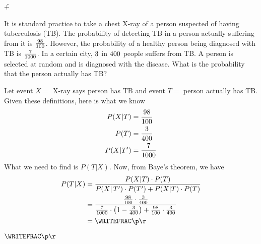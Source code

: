 


\EXPR[0]
\EXPR[0]\q{(\vb * (\vd - \vc))}
\EXPR[0]\r{\p + \q}

\question[5] It is standard practice to take a chest X-ray of a person 
suspected of having tuberculosis (TB). The probability of detecting TB in 
a person actually suffering from it is $\frac{98}{100}$. However, the 
probability of a healthy person being diagnosed with TB is $\frac{7}{1000}$. 
In a certain city, $3$ in $400$ people suffers from TB. A person is 
selected at random and is diagnosed with the disease. What is the probability
that the person actually has TB?  

\watchout

\begin{solution}[\fullpage]
	Let event $X =$ X-ray says person has TB and event $T=$ person actually has TB. Given these 
	definitions, here is what we know
	\begin{align}
		P(X\vert T) &= \dfrac{98}{100} \\
		P(T) &= \dfrac{3}{400} \\
		P(X\vert{T'}) &= \dfrac{7}{1000}
	\end{align}
	What we need to find is $P(T\vert X)$. Now, from Baye's theorem, we have 
	\begin{align}
		P(T\vert X) &= \dfrac{P(X\vert T)\cdot P(T)}{P(X\vert\,T')\cdot P(T') + P(X\vert T)\cdot P(T)} \\
		&= \dfrac{\frac{\va}{100}\cdot\frac{\vc}{\vd}}
		   {\frac{\vb}{1000}\cdot\left(1-\frac{\vc}{\vd}\right) + \frac{\va}{100}\cdot\frac{\vc}{\vd}} \\
		&= \WRITEFRAC\p\r
	\end{align}

\end{solution}

\ifprintanswers\begin{codex}$\WRITEFRAC\p\r$\end{codex}\fi
